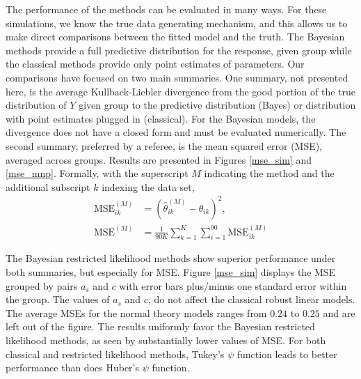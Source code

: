 \documentclass[ba]{imsart}
\newcommand{\response}[1]{{\color{blue}#1}}
\begin{document}
\response{The performance of the methods can be evaluated in many ways.  For these simulations, we know the true data generating mechanism, and this allows us to make direct comparisons between the fitted model and the truth.  The Bayesian methods provide a full predictive distribution for the response, given group while the classical methods provide only point estimates of parameters.  Our comparisons have focused on two main summaries.  One summary, not presented here, is the average Kullback-Liebler divergence from the good portion of the true distribution of $Y$ given group to the predictive distribution (Bayes) or distribution with point estimates plugged in (classical).  For the Bayesian models, the divergence does not have a closed form and must be evaluated numerically.  The second summary, preferred by a referee, is the mean squared error (MSE), averaged across groups.  Results are presented in Figures \ref{mse_sim} and \ref{mse_mnp}.  Formally, with the superscript $M$ indicating the method and the additional subscript $k$ indexing the data set,
\begin{align}
\label{MSE}
\mbox{MSE}^{(M)}_{ik} & = (\hat\theta^{(M)}_{ik} - \theta_{ik})^2,  \\ 
\mbox{MSE}^{(M)} & = \frac{1}{90K} \sum_{k = 1}^{K} \sum_{i=1}^{90} \mbox{MSE}^{(M)}_{ik}
\end{align}

The Bayesian restricted likelihood methods show superior performance under both summaries, but especially for MSE.  Figure \ref{mse_sim} displays the MSE grouped by pairs $a_{s}$ and $c$ with error bars plus/minus one standard error within the group.  The values of $a_{s}$ and $c$, do not affect the classical robust linear models. The average MSEs for the normal theory models ranges from $0.24$ to $0.25$ and are left out of the figure.  The results uniformly favor the Bayesian restricted likelihood methods, as seen by substantially lower values of MSE.  For both classical and restricted likelihood methods, Tukey's $\psi$ function leads to better performance than does Huber's $\psi$ function.  }
\end{document}
